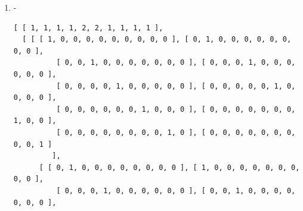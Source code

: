 \documentclass[a4paper, 10pt]{book}
\theoremstyle{definition}
\numberwithin{equation}{chapter}
\begin{document}
\begin{appendices}
\begin{enumerate}
\begin{lstlisting}[numbers=none]
          [ 0, 0, 1, 1, 0, 0, 0, 0, 1, 1 ], [ 1, 1, 0, 0, 0, 0, 1, 1, 0, 0 ],
          [ 0, 0, 0, 0, 0, 1, 0, 0, 0, 0 ], [ 0, 0, 0, 0, 0, 1, 0, 0, 0, 0 ],
          [ 0, 0, 0, 0, 1, 0, 0, 0, 0, 0 ], [ 0, 0, 0, 0, 1, 0, 0, 0, 0, 0 ] 
         ], 
      [ [ 0, 0, 0, 0, 0, 0, 1, 0, 0, 0 ], [ 0, 0, 0, 0, 0, 0, 0, 1, 0, 0 ], 
          [ 0, 0, 0, 0, 0, 0, 0, 0, 0, 1 ], [ 0, 0, 0, 0, 0, 0, 0, 0, 1, 0 ],
          [ 0, 0, 0, 0, 1, 0, 0, 0, 0, 0 ], [ 0, 0, 0, 0, 0, 1, 0, 0, 0, 0 ],
          [ 0, 1, 0, 0, 0, 0, 0, 0, 0, 0 ], [ 1, 0, 0, 0, 0, 0, 0, 0, 0, 0 ],
          [ 0, 0, 1, 0, 0, 0, 0, 0, 0, 0 ], [ 0, 0, 0, 1, 0, 0, 0, 0, 0, 0 ] 
         ], 
      [ [ 0, 0, 0, 0, 0, 0, 0, 1, 0, 0 ], [ 0, 0, 0, 0, 0, 0, 1, 0, 0, 0 ], 
          [ 0, 0, 0, 0, 0, 0, 0, 0, 1, 0 ], [ 0, 0, 0, 0, 0, 0, 0, 0, 0, 1 ],
          [ 0, 0, 0, 0, 1, 0, 0, 0, 0, 0 ], [ 0, 0, 0, 0, 0, 1, 0, 0, 0, 0 ],
          [ 1, 0, 0, 0, 0, 0, 0, 0, 0, 0 ], [ 0, 1, 0, 0, 0, 0, 0, 0, 0, 0 ],
          [ 0, 0, 0, 1, 0, 0, 0, 0, 0, 0 ], [ 0, 0, 1, 0, 0, 0, 0, 0, 0, 0 ] 
         ], 
      [ [ 0, 0, 0, 0, 0, 0, 0, 0, 1, 0 ], [ 0, 0, 0, 0, 0, 0, 0, 0, 0, 1 ], 
          [ 0, 0, 0, 0, 0, 0, 1, 0, 0, 0 ], [ 0, 0, 0, 0, 0, 0, 0, 1, 0, 0 ],
          [ 0, 0, 0, 0, 0, 1, 0, 0, 0, 0 ], [ 0, 0, 0, 0, 1, 0, 0, 0, 0, 0 ],
          [ 0, 0, 1, 0, 0, 0, 0, 0, 0, 0 ], [ 0, 0, 0, 1, 0, 0, 0, 0, 0, 0 ],
          [ 1, 0, 0, 0, 0, 0, 0, 0, 0, 0 ], [ 0, 1, 0, 0, 0, 0, 0, 0, 0, 0 ] 
         ], 
      [ [ 0, 0, 0, 0, 0, 0, 0, 0, 0, 1 ], [ 0, 0, 0, 0, 0, 0, 0, 0, 1, 0 ], 
          [ 0, 0, 0, 0, 0, 0, 0, 1, 0, 0 ], [ 0, 0, 0, 0, 0, 0, 1, 0, 0, 0 ],
          [ 0, 0, 0, 0, 0, 1, 0, 0, 0, 0 ], [ 0, 0, 0, 0, 1, 0, 0, 0, 0, 0 ],
          [ 0, 0, 0, 1, 0, 0, 0, 0, 0, 0 ], [ 0, 0, 1, 0, 0, 0, 0, 0, 0, 0 ],
          [ 0, 1, 0, 0, 0, 0, 0, 0, 0, 0 ], [ 1, 0, 0, 0, 0, 0, 0, 0, 0, 0 ] 
         ] ] ]
	\end{lstlisting}
	\item -\begin{lstlisting}[numbers=none]
	[ [ 1, 1, 1, 1, 2, 2, 1, 1, 1, 1 ], 
  [ [ [ 1, 0, 0, 0, 0, 0, 0, 0, 0, 0 ], [ 0, 1, 0, 0, 0, 0, 0, 0, 0, 0 ], 
          [ 0, 0, 1, 0, 0, 0, 0, 0, 0, 0 ], [ 0, 0, 0, 1, 0, 0, 0, 0, 0, 0 ],
          [ 0, 0, 0, 0, 1, 0, 0, 0, 0, 0 ], [ 0, 0, 0, 0, 0, 1, 0, 0, 0, 0 ],
          [ 0, 0, 0, 0, 0, 0, 1, 0, 0, 0 ], [ 0, 0, 0, 0, 0, 0, 0, 1, 0, 0 ],
          [ 0, 0, 0, 0, 0, 0, 0, 0, 1, 0 ], [ 0, 0, 0, 0, 0, 0, 0, 0, 0, 1 ] 
         ], 
      [ [ 0, 1, 0, 0, 0, 0, 0, 0, 0, 0 ], [ 1, 0, 0, 0, 0, 0, 0, 0, 0, 0 ], 
          [ 0, 0, 0, 1, 0, 0, 0, 0, 0, 0 ], [ 0, 0, 1, 0, 0, 0, 0, 0, 0, 0 ],

\end{lstlisting}
\end{enumerate}
\end{appendices}
\end{document}
